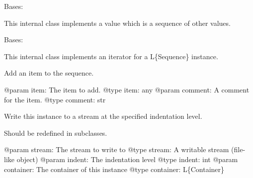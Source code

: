\documentclass[a4paper,10pt,english]{sphinxmanual}
\begin{document}
\begin{fulllineitems}
\label{commands/apidoc/src:src.pyconf.Sequence}
Bases: {\hyperref[commands/apidoc/src:src.pyconf.Container]{}}

This internal class implements a value which is a sequence of other values.

\begin{fulllineitems}
\label{commands/apidoc/src:src.pyconf.Sequence.SeqIter}
Bases: 

This internal class implements an iterator for a L\{Sequence\} instance.

\begin{fulllineitems}
\label{commands/apidoc/src:src.pyconf.Sequence.SeqIter.next}
\end{fulllineitems}


\end{fulllineitems}


\begin{fulllineitems}
\label{commands/apidoc/src:src.pyconf.Sequence.append}
Add an item to the sequence.

@param item: The item to add.
@type item: any
@param comment: A comment for the item.
@type comment: str

\end{fulllineitems}


\begin{fulllineitems}
\label{commands/apidoc/src:src.pyconf.Sequence.writeToStream}
Write this instance to a stream at the specified indentation level.

Should be redefined in subclasses.

@param stream: The stream to write to
@type stream: A writable stream (file-like object)
@param indent: The indentation level
@type indent: int
@param container: The container of this instance
@type container: L\{Container\}

\end{fulllineitems}


\end{fulllineitems}
\end{document}
